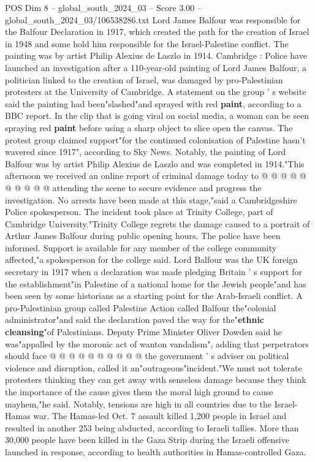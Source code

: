 \begin{textsample}{POS Dim 8 – global\_south\_2024\_03 – Score 3.00 – global\_south\_2024\_03/106538286.txt}  \label{ex:f8_pos_422}
Lord James Balfour was responsible for the Balfour Declaration in 1917, which created the path for the creation of Israel in 1948 and some hold him responsible for the Israel-Palestine conflict.
The painting was by artist Philip Alexius de Laszlo in 1914.
Cambridge : Police have launched an investigation after a 110-year-old painting of Lord James Balfour, a politician linked to the creation of Israel, was damaged by pro-Palestinian protesters at the University of Cambridge.
A statement on the group ' s website said the painting had been"slashed"and sprayed with red \textbf{paint}, according to a BBC report.
In the clip that is going viral on social media, a woman can be seen spraying red \textbf{paint} before using a sharp object to slice open the canvas.
The protest group claimed support"for the continued colonisation of Palestine hasn't wavered since 1917", according to Sky News.
Notably, the painting of Lord Balfour was by artist Philip Alexius de Laszlo and was completed in 1914."This afternoon we received an online report of criminal damage today to @ @ @ @ @ @ @ @ @ @ attending the scene to secure evidence and progress the investigation.
No arrests have been made at this stage,"said a Cambridgeshire Police spokesperson.
The incident took place at Trinity College, part of Cambridge University."Trinity College regrets the damage caused to a portrait of Arthur James Balfour during public opening hours.
The police have been informed.
Support is available for any member of the college community affected,"a spokesperson for the college said.
Lord Balfour was the UK foreign secretary in 1917 when a declaration was made pledging Britain ' s support for the establishment"in Palestine of a national home for the Jewish people"and has been seen by some historians as a starting point for the Arab-Israeli conflict.
A pro-Palestinian group called Palestine Action called Balfour the"colonial administrator"and said the declaration paved the way for the"\textbf{ethnic} \textbf{cleansing}"of Palestinians.
Deputy Prime Minister Oliver Dowden said he was"appalled by the moronic act of wanton vandalism", adding that perpetrators should face @ @ @ @ @ @ @ @ @ @ the government ' s adviser on political violence and disruption, called it an"outrageous"incident."We must not tolerate protesters thinking they can get away with senseless damage because they think the importance of the cause gives them the moral high ground to cause mayhem,"he said.
Notably, tensions are high in all countries due to the Israel-Hamas war.
The Hamas-led Oct. 7 assault killed 1,200 people in Israel and resulted in another 253 being abducted, according to Israeli tallies.
More than 30,000 people have been killed in the Gaza Strip during the Israeli offensive launched in response, according to health authorities in Hamas-controlled Gaza.

\end{textsample}
